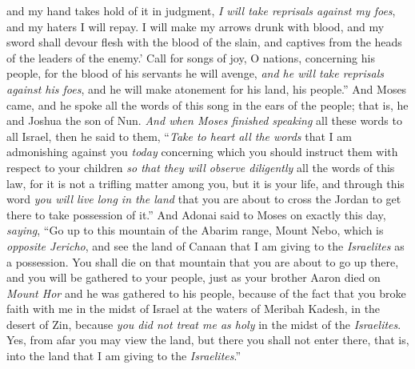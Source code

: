 \begin{biblechapter}
and my hand takes hold of it in judgment, 
\textit{I will take reprisals against my foes}, 
and my haters I will repay.
\verse I will make my arrows drunk with blood, 
and my sword shall devour flesh with the blood of the slain, 
and captives from the heads of the leaders of the enemy.’
\verse Call for songs of joy, O nations, concerning his people, 
for the blood of his servants he will avenge, 
\textit{and he will take reprisals against his foes}, 
and he will make atonement for his land, his people.”
\verse And Moses came, and he spoke all the words of this song in the ears of the people; that is, he and Joshua the son of Nun.
\verse \textit{And when Moses finished speaking} all these words to all Israel,
\verse then he said to them, “\textit{Take to heart all the words} that I am admonishing against you \textit{today} concerning which you should instruct them with respect to your children \textit{so that they will observe diligently} all the words of this law,
\verse for it is not a trifling matter among you, but it is your life, and through this word \textit{you will live long in the land} that you are about to cross the Jordan to get there to take possession of it.”
 And Adonai said to Moses on exactly this day, \textit{saying},
\verse “Go up to this mountain of the Abarim range, Mount Nebo, which is \textit{opposite Jericho}, and see the land of Canaan that I am giving to the \textit{Israelites} as a possession.
\verse You shall die on that mountain that you are about to go up there, and you will be gathered to your people, just as your brother Aaron died on \textit{Mount Hor} and he was gathered to his people,
\verse because of the fact that you broke faith with me in the midst of Israel at the waters of Meribah Kadesh, in the desert of Zin, because \textit{you did not treat me as holy} in the midst of the \textit{Israelites}.
\verse Yes, from afar you may view the land, but there you shall not enter there, that is, into the land that I am giving to the \textit{Israelites}.”
\end{biblechapter}

